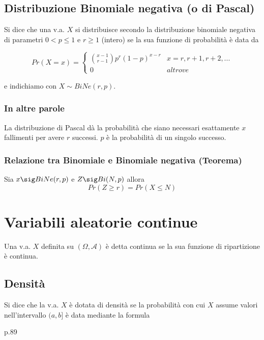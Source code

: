 \documentclass[12pt]{report}
\begin{document}
  \subsection{Distribuzione Binomiale negativa (o di Pascal)}
  Si dice che una v.a. $X$ si distribuisce secondo la distribuzione binomiale negativa di parametri $0 < p \leq 1$ e $r \geq 1$ (intero) se la sua funzione di probabilità è data da

  \[
    Pr(X=x)=
      \begin{cases}
          \binom{x-1}{r-1} p^r (1-p)^{x-r} & x=r, r+1, r+2,... \\
          0 & altrove
      \end{cases}
  \]

  e indichiamo con $X \sim BiNe(r,p)$.

  \subsubsection{In altre parole}
  La distribuzione di Pascal dà la probabilità che siano necessari esattamente $x$ fallimenti per avere $r$ successi. $p$ è la probabilità di un singolo successo.

  \subsubsection{Relazione tra Binomiale e Binomiale negativa (Teorema)}
  Sia $x \sig BiNe(r,p)$ e $Z \sig Bi(N,p)$ allora
  \[ Pr(Z \geq r) = Pr(X \leq N) \]

  \section{Variabili aleatorie continue}
  Una v.a. $X$ definita su $(\Omega, \mathcal{A})$ è detta continua se la sua funzione di ripartizione è continua.

  \subsection{Densità}
  Si dice che la v.a. $X$ è dotata di densità se la probabilità con cui $X$ assume valori nell'intervallo $(a,b]$ è data mediante la formula

  p.89
\end{document}
